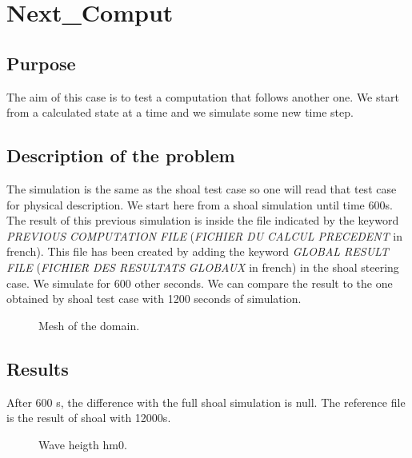 \chapter{Next\_Comput}

\section{Purpose}
%
The aim of this case is to test a computation that follows another one. We
start from a calculated state at a time and we simulate some new time step.
%
\section{Description of the problem}
%
The simulation is the same as the shoal test case so one will read that test
case for physical description. We start here from a shoal simulation until time
600s. The result of this previous simulation is inside the file indicated by
the keyword {\it PREVIOUS COMPUTATION FILE} ({\it FICHIER DU CALCUL PRECEDENT}
in french). This file has been created by adding the keyword  {\it GLOBAL
  RESULT FILE} ({\it FICHIER DES RESULTATS GLOBAUX} in french) in the shoal
steering case.
We simulate for 600 other seconds. We can compare the result to the one
obtained by shoal test case with 1200 seconds of simulation.
\begin{figure} [!h]
\centering
{}
 \caption{Mesh of the domain.}
\label{meshnextcomp}
\end{figure}

\section{Results}
After 600 s, the difference with the full shoal simulation is null. The
reference file is the result of shoal with 12000s.
\begin{figure} [!h]
\centering
{}
 \caption{Wave heigth hm0.}
\label{resnextcomp}
\end{figure}
